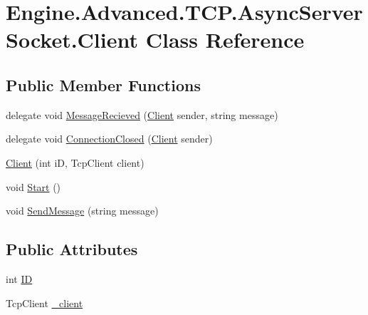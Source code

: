 \hypertarget{class_engine_1_1_advanced_1_1_t_c_p_1_1_async_server_socket_1_1_client}{}\section{Engine.\+Advanced.\+T\+C\+P.\+Async\+Server\+Socket.\+Client Class Reference}
\label{class_engine_1_1_advanced_1_1_t_c_p_1_1_async_server_socket_1_1_client}
\subsection*{Public Member Functions}
\begin{DoxyCompactItemize}
\item 
delegate void \mbox{\hyperlink{class_engine_1_1_advanced_1_1_t_c_p_1_1_async_server_socket_1_1_client_aec5803c220dbc6dbe3cabc218dcfde50}{Message\+Recieved}} (\mbox{\hyperlink{class_engine_1_1_advanced_1_1_t_c_p_1_1_async_server_socket_1_1_client}{Client}} sender, string message)
\item 
delegate void \mbox{\hyperlink{class_engine_1_1_advanced_1_1_t_c_p_1_1_async_server_socket_1_1_client_a773e682fb931f02885fd915baffa9600}{Connection\+Closed}} (\mbox{\hyperlink{class_engine_1_1_advanced_1_1_t_c_p_1_1_async_server_socket_1_1_client}{Client}} sender)
\item 
\mbox{\hyperlink{class_engine_1_1_advanced_1_1_t_c_p_1_1_async_server_socket_1_1_client_a47a904451e967f0eb64fb23caa8b4dc7}{Client}} (int iD, Tcp\+Client client)
\item 
void \mbox{\hyperlink{class_engine_1_1_advanced_1_1_t_c_p_1_1_async_server_socket_1_1_client_a3983119770da0daa19c905626b8fa5df}{Start}} ()
\item 
void \mbox{\hyperlink{class_engine_1_1_advanced_1_1_t_c_p_1_1_async_server_socket_1_1_client_abe931ff844822962811b598617554816}{Send\+Message}} (string message)
\end{DoxyCompactItemize}
\subsection*{Public Attributes}
\begin{DoxyCompactItemize}
\item 
int \mbox{\hyperlink{class_engine_1_1_advanced_1_1_t_c_p_1_1_async_server_socket_1_1_client_abaf4a35d879437897c2023a493ac34a9}{ID}}
\item 
Tcp\+Client \mbox{\hyperlink{class_engine_1_1_advanced_1_1_t_c_p_1_1_async_server_socket_1_1_client_a1e37014f05b0f64461e3e045f3ad9dda}{\+\_\+client}}
\end{DoxyCompactItemize}
